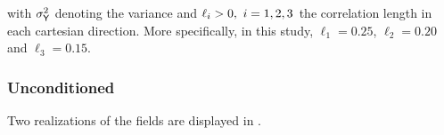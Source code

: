 \noindent with ${\sigma_{\mathsf{Y}}^{2}}$ denoting the variance and $\ell_{i}>0,\ i=1,2,3$ the correlation length in each cartesian direction.
More specifically, in this study, $\ell_{1}=0.25$, $\ell_{2}=0.20$ and $\ell_{3}=0.15$.

\subsubsection{Unconditioned}

Two realizations of the fields are displayed in .

\begin{figure}[H]
 \centering

\end{figure}
